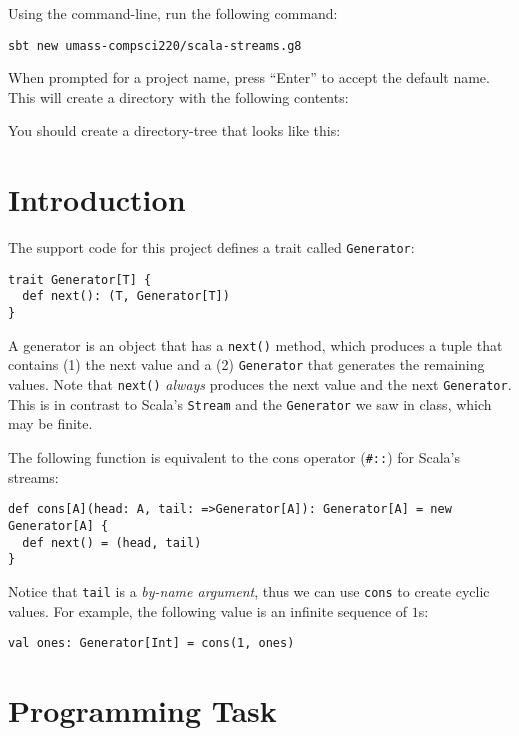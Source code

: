 \documentclass[9pt]{extbook}
\begin{document}
Using the command-line, run the following command:

\begin{lstlisting}
sbt new umass-compsci220/scala-streams.g8
\end{lstlisting}

When prompted for a project name, press ``Enter'' to accept the default name.
This will create a directory with the following contents:

You should create a directory-tree that looks like this:


\section{Introduction}

The support code for this project defines a trait called \lstinline|Generator|:

\begin{lstlisting}
trait Generator[T] {
  def next(): (T, Generator[T])
}
\end{lstlisting}

A generator is an object that has a \lstinline|next()| method, which produces
a tuple that contains (1) the next value and a (2) \lstinline|Generator| that generates
the remaining values. Note that \lstinline|next()| \emph{always} produces the next
value and the next \lstinline|Generator|. This is in contrast to
Scala's \lstinline|Stream| and the \lstinline|Generator| we saw in class,
which may be finite.

The following function is equivalent to the cons operator (\lstinline|#::|)
for Scala's streams:
\begin{lstlisting}
def cons[A](head: A, tail: =>Generator[A]): Generator[A] = new Generator[A] {
  def next() = (head, tail)
}
\end{lstlisting}

Notice that \lstinline|tail| is a \emph{by-name argument}, thus we can use
\lstinline|cons| to create cyclic values. For example, the following value
is an infinite sequence of $1$s:
\begin{lstlisting}
val ones: Generator[Int] = cons(1, ones)
\end{lstlisting}

\section{Programming Task}
\end{document}
